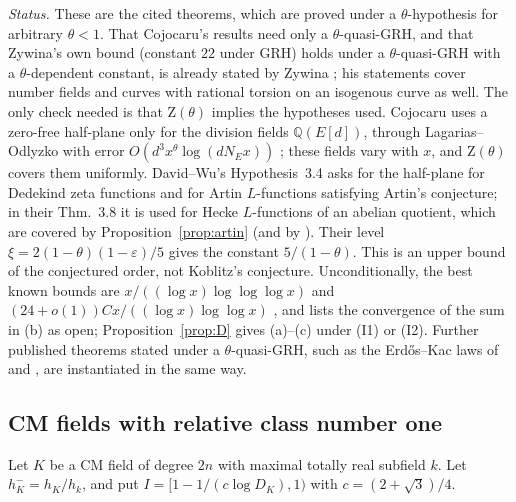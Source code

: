 \documentclass[11pt]{amsart}
\theoremstyle{definition}
\theoremstyle{remark}
\newcommand{\Q}{\mathbb{Q}}
\newcommand{\Zt}{\mathrm{Z}}       %
\begin{document}
\emph{Status.} These are the cited theorems, which are proved under a $\theta$-hypothesis for arbitrary $\theta<1$.
That Cojocaru's results need only a $\theta$-quasi-GRH, and that Zywina's own bound \cite[Thm.~1.3(ii)]{Zyw08}
(constant $22$ under GRH) holds under a $\theta$-quasi-GRH with a $\theta$-dependent constant, is already stated by
Zywina \cite[footnote~1]{Zyw08}; his statements cover number fields and curves with rational torsion on an isogenous
curve as well. The only check needed is that $\Zt(\theta)$ implies the hypotheses used. Cojocaru uses a zero-free
half-plane only for the division fields $\Q(E[d])$, through Lagarias--Odlyzko with error $O(d^3x^\theta\log(dN_Ex))$
\cite[Rem.~12]{Coj05}; these fields vary with $x$, and $\Zt(\theta)$ covers them uniformly. David--Wu's
Hypothesis~3.4 asks for the half-plane for Dedekind zeta functions and for Artin $L$-functions satisfying Artin's
conjecture; in their Thm.~3.8 it is used for Hecke $L$-functions of an abelian quotient, which are covered by
Proposition~\ref{prop:artin} (and by \cite[Cor.~1.2]{CT}). Their level $\xi=2(1-\theta)(1-\varepsilon)/5$ gives the
constant $5/(1-\theta)$. This is an upper bound of the conjectured order, not Koblitz's conjecture. Unconditionally, the best known
bounds are $x/((\log x)\log\log\log x)$ \cite{Coj05} and $(24+o(1))Cx/((\log x)\log\log x)$
\cite[Thm.~1.3(i)]{Zyw08}, and \cite[Rem.~1.4]{Zyw08} lists the convergence of the sum in (b) as open;
Proposition~\ref{prop:D} gives (a)--(c) under (I1) or (I2). Further published
theorems stated under a $\theta$-quasi-GRH, such as the Erd\H{o}s--Kac laws of \cite{MMP} and \cite[Thm.~1, Cor.~2]{CM},
are instantiated in the same way.

\subsection{CM fields with relative class number one}

Let $K$ be a CM field of degree $2n$ with maximal totally real subfield $k$. Let $h^-_K=h_K/h_k$, and put
$I=[1-1/(c\log D_K),1)$ with $c=(2+\sqrt3)/4$.
\end{document}
